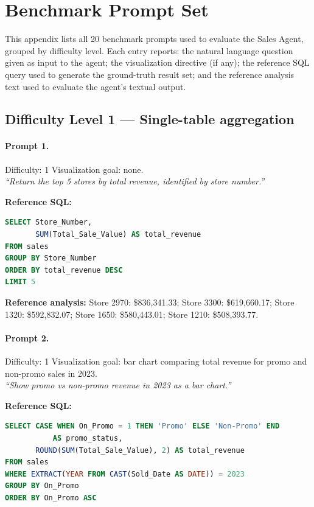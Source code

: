 \appendix
\section{Benchmark Prompt Set}
\label{appendix:benchmark}

This appendix lists all 20 benchmark prompts used to evaluate the Sales Agent,
grouped by difficulty level. Each entry reports: the natural language question
given as input to the agent; the visualization directive (if any); the reference
SQL query used to generate the ground-truth result set; and the reference analysis
text used to evaluate the agent's textual output.

\subsection*{Difficulty Level 1 — Single-table aggregation}

\paragraph{Prompt 1.}
Difficulty: 1 \quad Visualization goal: none.\\[2pt]
\textit{``Return the top 5 stores by total revenue, identified by store number.''}

\textbf{Reference SQL:}
\begin{lstlisting}[language=SQL]
SELECT Store_Number,
       SUM(Total_Sale_Value) AS total_revenue
FROM sales
GROUP BY Store_Number
ORDER BY total_revenue DESC
LIMIT 5
\end{lstlisting}

\textbf{Reference analysis:}
Store 2970: \$836,341.33; Store 3300: \$619,660.17; Store 1320: \$592,832.07;
Store 1650: \$580,443.01; Store 1210: \$508,393.77.

\bigskip

\paragraph{Prompt 2.}
Difficulty: 1 \quad Visualization goal: bar chart comparing total revenue for promo and non-promo sales in 2023.\\[2pt]
\textit{``Show promo vs non-promo revenue in 2023 as a bar chart.''}

\textbf{Reference SQL:}
\begin{lstlisting}[language=SQL]
SELECT CASE WHEN On_Promo = 1 THEN 'Promo' ELSE 'Non-Promo' END
           AS promo_status,
       ROUND(SUM(Total_Sale_Value), 2) AS total_revenue
FROM sales
WHERE EXTRACT(YEAR FROM CAST(Sold_Date AS DATE)) = 2023
GROUP BY On_Promo
ORDER BY On_Promo ASC
\end{lstlisting}


